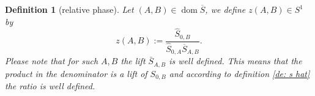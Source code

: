 \documentclass[b5paper,draft,openbib,12pt]{memoir}
\newtheorem{Def}{Definition}
\DeclareMathOperator{\dom}{dom}
\begin{document}








\begin{Def}[relative phase]\label{def relative phase}
Let \((A,B) \in\dom\overline{S}\), we define \(z(A,B)\in S^1\) by
\begin{equation}\label{def z}
z(A,B):=\frac{\hat{S}_{0,B}}{\hat{S}_{0,A}\overline{S}_{A,B}}.
\end{equation}
Please note that for such \(A,B\) the lift \(\bar{S}_{A,B}\) 
is well defined. This means that the product in the 
denominator is a lift of \(S_{0,B}\)
and according to definition \ref{de: s hat} the 
ratio is well defined. 
\end{Def}
\end{document}
